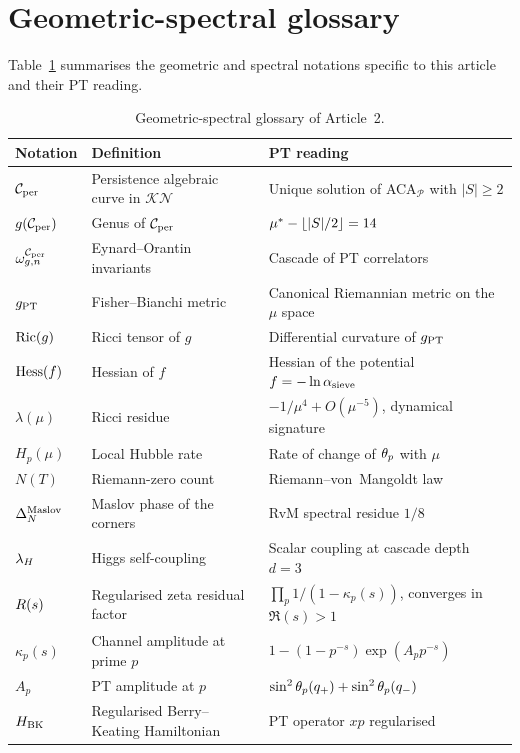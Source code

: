 \section{Geometric-spectral glossary}
\label{app:glossaire_en}

Table~\ref{tab:glossaire2_en} summarises the geometric and spectral notations specific to this article and their PT reading.

\begin{table}[htbp]
\centering
\small
\begin{tabular}{@{}p{3.5cm}p{5cm}p{6cm}@{}}
\toprule
Notation & Definition & PT reading \\
\midrule
$\mathcal{C}_{\rm per}$ & Persistence algebraic curve in $\mathcal{KN}$ & Unique solution of ACA$_{\mathcal P}$ with $|S| \geq 2$ \\
$g(\mathcal{C}_{\rm per})$ & Genus of $\mathcal{C}_{\rm per}$ & $\mu^{*} - \lfloor |S|/2 \rfloor = 14$ \\
$\omega_{g,n}^{\mathcal{C}_{\rm per}}$ & Eynard--Orantin invariants & Cascade of PT correlators \\
$g_{\rm PT}$ & Fisher--Bianchi metric & Canonical Riemannian metric on the $\mu$ space \\
$\mathrm{Ric}(g)$ & Ricci tensor of $g$ & Differential curvature of $g_{\rm PT}$ \\
$\mathrm{Hess}(f)$ & Hessian of $f$ & Hessian of the potential $f = -\ln \alpha_{\rm sieve}$ \\
$\lambda(\mu)$ & Ricci residue & $-1/\mu^{4} + O(\mu^{-5})$, dynamical signature \\
$H_p(\mu)$ & Local Hubble rate & Rate of change of $\theta_{p}$ with $\mu$ \\
$N(T)$ & Riemann-zero count & Riemann--von~Mangoldt law \\
$\Delta_N^{\rm Maslov}$ & Maslov phase of the corners & RvM spectral residue $1/8$ \\
$\lambda_H$ & Higgs self-coupling & Scalar coupling at cascade depth $d=3$ \\
$R(s)$ & Regularised zeta residual factor & $\prod_p 1/(1 - \kappa_p(s))$, converges in $\Re(s) > 1$ \\
$\kappa_p(s)$ & Channel amplitude at prime $p$ & $1 - (1 - p^{-s})\exp(A_p p^{-s})$ \\
$A_p$ & PT amplitude at $p$ & $\sin^{2}\theta_{p}(q_{+}) + \sin^{2}\theta_{p}(q_{-})$ \\
$H_{\rm BK}$ & Regularised Berry--Keating Hamiltonian & PT operator $xp$ regularised \\
\bottomrule
\end{tabular}
\caption{Geometric-spectral glossary of Article~2.}
\label{tab:glossaire2_en}
\end{table}
